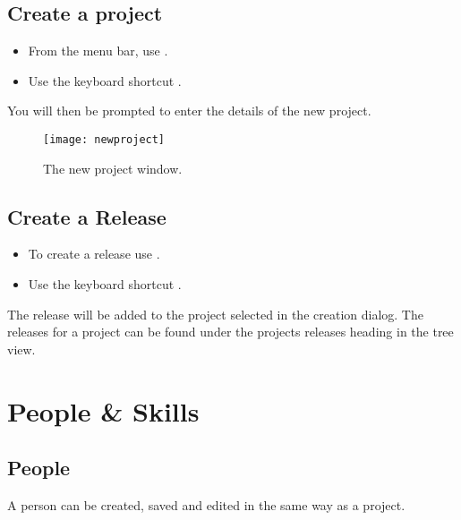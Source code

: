 \documentclass[11pt,fleqn]{book} %
\begin{document}
\subsection{Create a project}
    \begin{itemize}
        \item From the menu bar, use .
        \item Use the keyboard shortcut .
    \end{itemize}
    You will then be prompted to enter the details of the new project.

    \begin{figure}[h]
        \centering
        \texttt{[image: newproject]}
        \caption{The new project window.\label{newproject}}
    \end{figure}

\subsection{Create a Release}
    \begin{itemize}
        \item To create a release use .
        \item Use the keyboard shortcut .
    \end{itemize}
    The release will be added to the project selected in the creation dialog.
    The releases for a project can be found under the projects releases heading in the tree view.

\section{People \& Skills}
\subsection{People}
A person can be created, saved and edited in the same way as a project.
\end{document}
